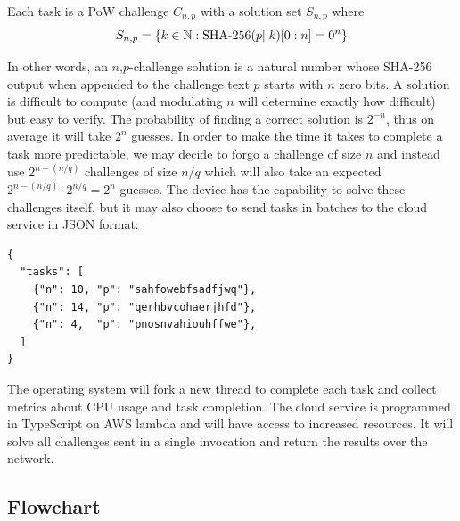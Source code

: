 \documentclass[twoside,twocolumn]{article}
\newcommand{\newp}{\newline\indent}
\begin{document}
Each task is a PoW challenge $C_{n,p}$ with a solution set $S_{n,p}$ where
\[
  S_{n,p} = \{ k \in \mathbb{N} : \textnormal{SHA-256}(p || k)[0:n] = 0^n \}
\]

In other words, an $n$,$p$-challenge solution is a natural number whose SHA-256 output when appended to the challenge text $p$ starts with $n$ zero bits.
A solution is difficult to compute (and modulating $n$ will determine exactly how difficult) but easy to verify.
\newp The probability of finding a correct solution is $2^{-n}$, thus on average it will take $2^n$ guesses.
In order to make the time it takes to complete a task more predictable, we may decide to forgo a challenge of size $n$ and instead use $2^{n-(n/q)}$ challenges of size $n/q$ which will also take an expected $2^{n-(n/q)} \cdot 2^{n/q} = 2^n$ guesses.
\newp The device has the capability to solve these challenges itself, but it may also choose to send tasks in batches to the cloud service in JSON format:

\begin{verbatim}
{
  "tasks": [
    {"n": 10, "p": "sahfowebfsadfjwq"},
    {"n": 14, "p": "qerhbvcohaerjhfd"},
    {"n": 4,  "p": "pnosnvahiouhffwe"},
  ]
}
\end{verbatim}

The operating system will fork a new thread to complete each task and collect metrics about CPU usage and task completion.
\newp The cloud service is programmed in TypeScript on AWS lambda and will have access to increased resources.
It will solve all challenges sent in a single invocation and return the results over the network.
    
\subsection{Flowchart}
\end{document}
